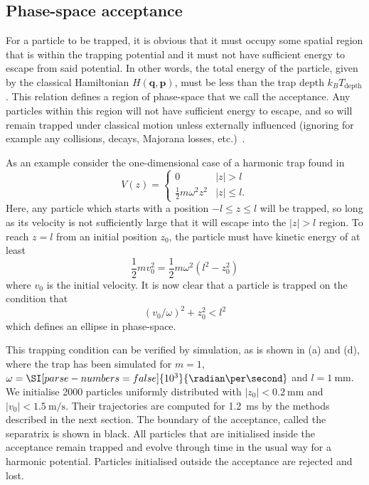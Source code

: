 \subsection{Phase-space acceptance}

For a particle to be trapped, it is obvious that it must occupy some spatial
region that is within the trapping potential and it must not have sufficient
energy to escape from said potential. In other words, the total energy of the
particle, given by the classical Hamiltonian $H(\mathbf{q}, \mathbf{p})$, must
be less than the trap depth $k_B T_\text{depth}$.  This relation defines a region
of phase-space that we call the acceptance. Any particles within this region
will not have sufficient energy to escape, and so will remain trapped under
classical motion unless externally influenced (ignoring for example any
collisions, decays, Majorana losses, etc.)~\cite{Lichtenberg1969}.

As an example consider the one-dimensional case of a harmonic trap found in 
%
\begin{equation}
  V(z) = \begin{cases}
    0 & |z| > l \\
    \frac{1}{2}m\omega^2 z^2 & |z| \leq l.
  \end{cases}
\end{equation}
%
Here, any particle which starts with a position $-l \leq z \leq l$ will be
trapped, so long as its velocity is not sufficiently large that it will escape
into the $|z|> l$ region. To reach $z=l$ from an initial position $z_0$, the
particle must have kinetic energy of at least
%
\begin{equation}
  \frac{1}{2}mv_0^2 = \frac{1}{2}m\omega^2(l^2 - z_0^2)
\end{equation}
%
where $v_0$ is the initial velocity. It is now clear that a particle is trapped
on the condition that
%
\begin{equation}
  (v_0/\omega)^2 + z_0^2 < l^2
\end{equation}
%
which defines an ellipse in phase-space.


This trapping condition can be verified by simulation, as is shown in
 (a) and (d), where the trap has been simulated for
$m = 1$, $\omega = \SI[parse-numbers=false]{10^3}{\radian\per\second}$ and $l
=\SI{1}{\milli\meter}$. We initialise 2000 particles uniformly distributed with
$|z_0| < \SI{0.2}{\milli\meter}$ and $|v_0|< \SI{1.5}{\meter\per\second}$.
Their trajectories are computed for \SI{1.2}{\milli\second} by the methods
described in the next section. The boundary of the acceptance, called the
separatrix is shown in black. All particles that are initialised inside the
acceptance remain trapped and evolve through time in the usual way for a
harmonic potential.  Particles initialised outside the acceptance are rejected
and lost.

